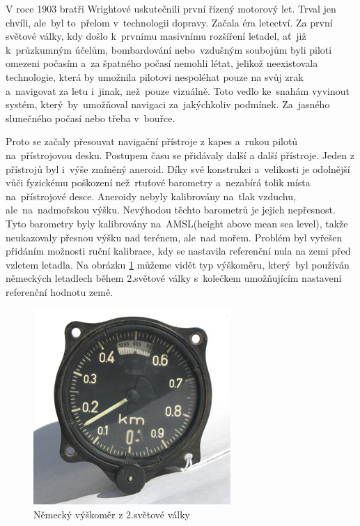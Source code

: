 		V roce 1903 bratři Wrightové uskutečnili první řízený motorový let. Trval jen chvíli, ale~byl to~přelom v~technologii dopravy. Začala éra letectví. Za první světové války, kdy došlo k~prvnímu masivnímu rozšíření letadel,  ať~již k~průzkumným účelům, bombardování nebo~vzdušným soubojům byli piloti omezeni počasím a~za špatného počasí nemohli létat, jelikož neexistovala technologie, která by umožnila pilotovi nespoléhat pouze na svůj zrak a~navigovat za letu i~jinak, než~pouze vizuálně. Toto vedlo ke~snahám vyvinout systém, který~by~umožňoval navigaci za~jakýchkoliv podmínek. Za~jasného slunečného počasí nebo třeba v~bouřce.\par

		Proto se začaly přesouvat navigační přístroje z kapes a~rukou pilotů na~přístrojovou desku. Postupem času se přidávaly další a další přístroje. Jeden z přístrojů byl i~výše zmíněný aneroid.  Díky své konstrukci a~velikosti je odolnější vůči fyzickému poškození než~rtuťové barometry a~nezabírá tolik místa na~přístrojové desce. Aneroidy nebyly kalibrovány na~tlak vzduchu, ale~na~nadmořskou výšku. Nevýhodou těchto barometrů je jejich nepřesnost. Tyto barometry byly kalibrovány na~AMSL(height above mean sea level), takže neukazovaly přesnou výšku nad terénem, ale~nad mořem. Problém byl vyřešen přidáním možnosti ruční kalibrace, kdy se nastavila referenční nula na zemi před vzletem letadla. 
		Na obrázku \ref{uvod::historieVyskomeru::kokpit} můžeme vidět typ výškoměru, který~byl používán německých letadlech během 2.světové války s~kolečkem umožňujícím nastavení referenční hodnotu země. 
		
		\begin{figure}[h]
			\begin{center}
				\includegraphics[scale=0.8]{obrazky-figures/109Altimeter.jpg}
				\caption{Německý výškoměr z 2.světové války\protect\footnotemark}
				\label{uvod::historieVyskomeru::kokpit}
			\end{center}
		\end{figure}
		
